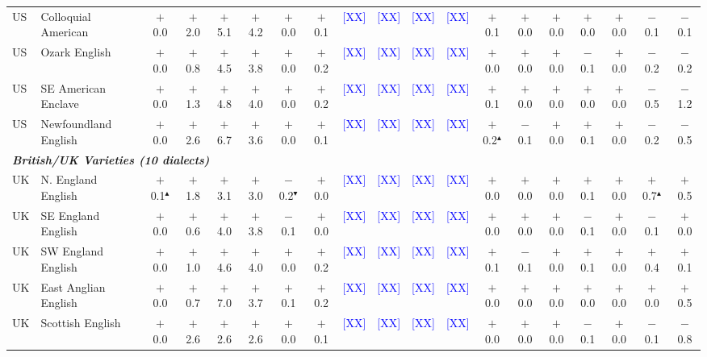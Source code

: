 \begin{table}[t]
\begin{tabular}{llccccccccccccccccc}
US & Colloquial American & $+$0.0 & $+$2.0 & $+$5.1 & $+$4.2 & $+$0.0 & $+$0.1 & \textcolor{blue}{[XX]} & \textcolor{blue}{[XX]} & \textcolor{blue}{[XX]} & \textcolor{blue}{[XX]} & $+$0.1 & $+$0.0 & $+$0.0 & $+$0.0 & $+$0.0 & $-$0.1 & $-$0.1 \\
US & Ozark English & $+$0.0 & $+$0.8 & $+$4.5 & $+$3.8 & $+$0.0 & $+$0.2 & \textcolor{blue}{[XX]} & \textcolor{blue}{[XX]} & \textcolor{blue}{[XX]} & \textcolor{blue}{[XX]} & $+$0.0 & $+$0.0 & $+$0.0 & $-$0.1 & $+$0.0 & $-$0.2 & $-$0.2 \\
US & SE American Enclave & $+$0.0 & $+$1.3 & $+$4.8 & $+$4.0 & $+$0.0 & $+$0.2 & \textcolor{blue}{[XX]} & \textcolor{blue}{[XX]} & \textcolor{blue}{[XX]} & \textcolor{blue}{[XX]} & $+$0.1 & $+$0.0 & $+$0.0 & $+$0.0 & $+$0.0 & $-$0.5 & $-$1.2 \\
US & Newfoundland English & $+$0.0 & $+$2.6 & $+$6.7 & $+$3.6 & $+$0.0 & $+$0.1 & \textcolor{blue}{[XX]} & \textcolor{blue}{[XX]} & \textcolor{blue}{[XX]} & \textcolor{blue}{[XX]} & $+$0.2$^\blacktriangle$ & $-$0.1 & $+$0.0 & $+$0.1 & $+$0.0 & $-$0.2 & $-$0.5 \\
\midrule
\multicolumn{19}{l}{\textit{\textbf{British/UK Varieties (10 dialects)}}} \\
UK & N. England English & $+$0.1$^\blacktriangle$ & $+$1.8 & $+$3.1 & $+$3.0 & $-$0.2$^\blacktriangledown$ & $+$0.0 & \textcolor{blue}{[XX]} & \textcolor{blue}{[XX]} & \textcolor{blue}{[XX]} & \textcolor{blue}{[XX]} & $+$0.0 & $+$0.0 & $+$0.0 & $+$0.1 & $+$0.0 & $+$0.7$^\blacktriangle$ & $+$0.5 \\
UK & SE England English & $+$0.0 & $+$0.6 & $+$4.0 & $+$3.8 & $-$0.1 & $+$0.0 & \textcolor{blue}{[XX]} & \textcolor{blue}{[XX]} & \textcolor{blue}{[XX]} & \textcolor{blue}{[XX]} & $+$0.0 & $+$0.0 & $+$0.0 & $-$0.1 & $+$0.0 & $-$0.1 & $+$0.0 \\
UK & SW England English & $+$0.0 & $+$1.0 & $+$4.6 & $+$4.0 & $+$0.0 & $+$0.2 & \textcolor{blue}{[XX]} & \textcolor{blue}{[XX]} & \textcolor{blue}{[XX]} & \textcolor{blue}{[XX]} & $+$0.1 & $-$0.1 & $+$0.0 & $+$0.1 & $+$0.0 & $+$0.4 & $+$0.1 \\
UK & East Anglian English & $+$0.0 & $+$0.7 & $+$7.0 & $+$3.7 & $+$0.1 & $+$0.2 & \textcolor{blue}{[XX]} & \textcolor{blue}{[XX]} & \textcolor{blue}{[XX]} & \textcolor{blue}{[XX]} & $+$0.0 & $+$0.0 & $+$0.0 & $+$0.0 & $+$0.0 & $+$0.0 & $+$0.5 \\
UK & Scottish English & $+$0.0 & $+$2.6 & $+$2.6 & $+$2.6 & $+$0.0 & $+$0.1 & \textcolor{blue}{[XX]} & \textcolor{blue}{[XX]} & \textcolor{blue}{[XX]} & \textcolor{blue}{[XX]} & $+$0.0 & $+$0.0 & $+$0.0 & $-$0.1 & $+$0.0 & $-$0.1 & $-$0.8 \\

\end{tabular}
\end{table}
